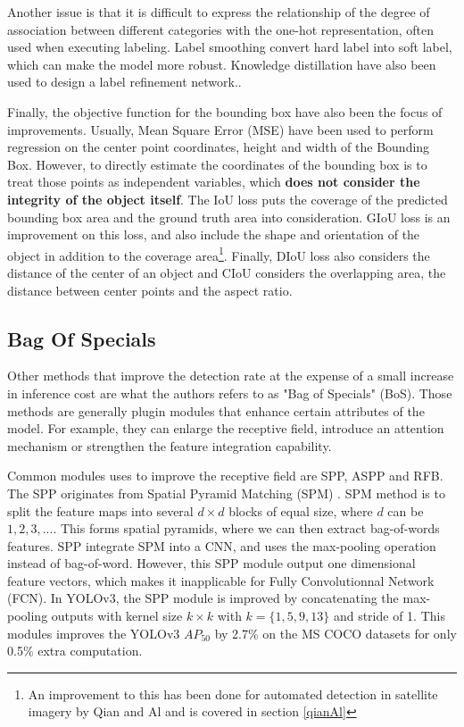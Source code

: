 Another issue is that it is difficult to express the relationship of the degree of association between different categories with the one-hot representation, often used when executing labeling. Label smoothing\cite{labelSmooth} convert hard label into soft label, which can make the model more robust. Knowledge distillation have also been used to design a label refinement network.\cite{knowledgeDistillation}.

Finally, the objective function for the bounding box have also been the focus of improvements. Usually, Mean Square Error (MSE) have been used to perform regression on the center point coordinates, height and width of the Bounding Box. However, to directly estimate the coordinates of the bounding box is to treat those points as independent variables, which \textbf{does not consider the integrity of the object itself}. The IoU loss\cite{iouloss} puts the coverage of the predicted bounding box area and the ground truth area into consideration. GIoU loss\cite{giou} is an improvement on this loss, and also include the shape and orientation of the object in addition to the coverage area\footnote{An improvement to this has been done for automated detection in satellite imagery by Qian and Al and is covered in section \ref{qianAl}}. Finally, DIoU loss\cite{diou} also considers the distance of the center of an object and CIoU\cite{diou} considers the overlapping area, the distance between center points and the aspect ratio.

\subsection{Bag Of Specials}\label{bos}
Other methods that improve the detection rate at the expense of a small increase in inference cost are what the authors refers to as "Bag of Specials" (BoS). Those methods are generally plugin modules that enhance certain attributes of the model. For example, they can enlarge the receptive field, introduce an attention mechanism or strengthen the feature integration capability.

Common modules uses to improve the receptive field are SPP\cite{spp}, ASPP\cite{aspp} and RFB\cite{RFB}. The SPP originates from Spatial Pyramid Matching (SPM) \cite{SPM}. SPM method is to split the feature maps into several $d \times d$ blocks of equal size, where $d$ can be ${1, 2, 3,...}$. This forms spatial pyramids, where we can then extract bag-of-words features. SPP integrate SPM into a CNN, and uses the max-pooling operation instead of bag-of-word. However, this SPP module output one dimensional feature vectors, which makes it inapplicable for Fully Convolutionnal Network (FCN). In YOLOv3\cite{yolov3}, the SPP module is improved by concatenating the max-pooling outputs with kernel size $k \times k$ with $k = \{1, 5, 9, 13\}$ and stride of 1. This modules improves the YOLOv3 $AP_{50}$ by 2.7\% on the MS COCO\cite{msCOCO} datasets for only  0.5\% extra computation. 

